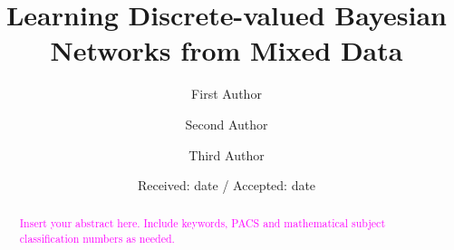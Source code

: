 \DeclareMathOperator*{\argmin}{arg\,min}
\DeclareMathOperator*{\argmax}{arg\,max}

\newcommand{\todo}[1]{\textcolor{magenta}{#1}}
\newcommand{\tim}[1]{\textit{\textcolor{blue}{#1}}}




\title{Learning Discrete-valued Bayesian Networks from Mixed Data%
}


\author{First Author         \and
        Second Author         \and
        Third Author%
}



\date{Received: date / Accepted: date}


\maketitle

\begin{abstract}
\todo{
Insert your abstract here. Include keywords, PACS and mathematical
subject classification numbers as needed.
}
\end{abstract}

